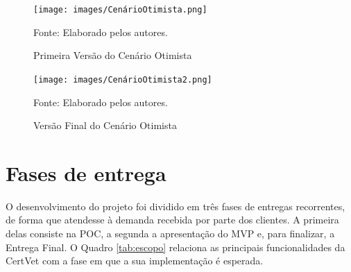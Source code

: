 \documentclass[
    12pt,               %
    openright,          %
    oneside,
    a4paper,            %
    BIBLATEX,           %
    TODO,               %
    english,            %
    brazil              %
    ]{ifsp-spo-inf-ctds}
\begin{document}
            \begin{figure}[H]
                \centering
                \caption{Primeira Versão do Cenário Otimista}
                \texttt{[image: images/CenárioOtimista.png]}

                \label{fig:cenarioOtimistaGrafico}
                \centering
            \footnotesize Fonte: Elaborado pelos autores.
            \end{figure}

            
            \begin{figure}[H]
                \centering
                 \caption{Versão Final do Cenário Otimista}
                \texttt{[image: images/CenárioOtimista2.png]}

                \label{fig:cenarioOtimistaGrafico2}
                \centering
            \footnotesize Fonte: Elaborado pelos autores.
            \end{figure}

    \section{Fases de entrega}

        O desenvolvimento do projeto foi dividido em três fases de entregas recorrentes, de forma que atendesse à demanda recebida por parte dos clientes. A primeira delas consiste na POC, a segunda a apresentação do MVP e, para finalizar, a Entrega Final. O Quadro \ref{tab:escopo} relaciona as principais funcionalidades da CertVet com a fase em que a sua implementação é esperada.
\end{document}
